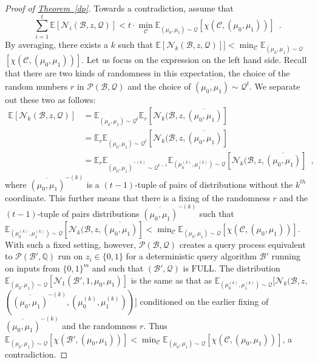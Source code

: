 \documentclass[11pt]{article}
\numberwithin{equation}{section}
\theoremstyle{definition}
\theoremstyle{plain}
\newcommand{\Q}{\mathbb Q}
\newcommand{\expref}[2]{\hyperref[#2]{#1~\ref{#2}}}
\newcommand{\full}{\text{FULL}}
\newcommand{\clB}{\mathcal{B}}
\newcommand{\clC}{\mathcal{C}}
\newcommand{\clQ}{\mathcal{Q}}
\newcommand{\clP}{\mathcal{P}}
\newcommand{\clN}{\mathcal{N}}
\newcommand{\E}{\mathbb{E}}
\begin{document}
\begin{proof}[Proof of {\expref{Theorem}{dp}}]
Towards a contradiction, assume that 
\begin{equation}
\sum_{i=1}^t \E[\clN_i(\clB, z,\clQ)] < t \cdot \min_{\clC} \E_{(\mu_0,\mu_1) \sim \clQ} [\chi(\clC, (\mu_0,\mu_1))] \enspace .
\label{hyp}
\end{equation}
By averaging, there exists a $k$ such that $\E[\clN_k(\clB, z, \clQ)]] < \min_{\clC}\E_{(\mu_0,\mu_1)\sim \clQ}$\\$[\chi(\clC, (\mu_0,\mu_1))]$. 
Let us focus on the expression on the left hand side.  Recall that there are two kinds of randomness in this expectation, the choice of the 
random numbers $r$ in $\clP(\clB, \clQ)$ and the choice of $\overline{(\mu_0, \mu_1)} \sim \clQ^t$.  We separate out these two as follows:
\begin{align*}
\E[\clN_k(\clB, z, \clQ)] &= \E_{\overline{(\mu_0, \mu_1)} \sim \clQ^t} \E_r[\clN_k(\clB, z, \overline{(\mu_0, \mu_1)}] \\
&= \E_r \E_{\overline{(\mu_0, \mu_1)} \sim \clQ^t} [\clN_k(\clB, z, \overline{(\mu_0, \mu_1)}] \\
&=\E_r \E_{\overline{(\mu_0, \mu_1)}^{-(k)} \sim \clQ^{t-1}} \E_{(\mu_0^{(k)}, \mu_1^{(k)}) \sim \clQ} [\clN_k(\clB, z, \overline{(\mu_0, \mu_1)}] \enspace,
\end{align*}
where $\overline{(\mu_0, \mu_1)}^{-(k)}$ is a $(t-1)$-tuple of pairs of distributions without the $k^{th}$ coordinate.  This further means that there is a fixing of the randomness $r$ and 
the $(t-1)$-tuple of pairs distributions $\overline{(\mu_0, \mu_1)}^{-(k)}$ such that 
$\E_{(\mu_0^{(k)}, \mu_1^{(k)}) \sim \clQ} [\clN_k(\clB, z, \overline{(\mu_0, \mu_1)}] < \min_{\clC} \E_{(\mu_0,\mu_1) \sim \clQ} [\chi(\clC, (\mu_0,\mu_1))]$.
With such a fixed setting, however,  $\clP(\clB, \clQ)$ creates a query process equivalent to $\clP(\clB',\Q)$ run on $z_i \in \{0,1\}$ for a deterministic query algorithm $\clB'$ running on inputs from $\{0,1\}^m$ and 
such that $(\clB', \clQ)$ is $\full$.  The distribution $\E_{(\mu_0, \mu_1) \sim \clQ}[\clN_1(\clB',1, \mu_0,\mu_1)]$ is the same as that as 
$\E_{(\mu_0^{(k)}, \mu_1^{(k)}) \sim \clQ}[\clN_k(\clB, z,$\\$ (\overline{(\mu_0, \mu_1)}^{-(k)}, (\mu_0^{(k)}, \mu_1^{(k)}))]$
conditioned on the earlier fixing of $\overline{(\mu_0, \mu_1)}^{-(k)}$ and the randomness $r$.  Thus $\E_{(\mu_0, \mu_1) \sim \clQ} [\chi(\clB', (\mu_0, \mu_1))] < \min_{\clC}\E_{(\mu_0,\mu_1)\sim \clQ} [\chi(\clC, (\mu_0,\mu_1))]$, a contradiction.
\end{proof}
\end{document}
